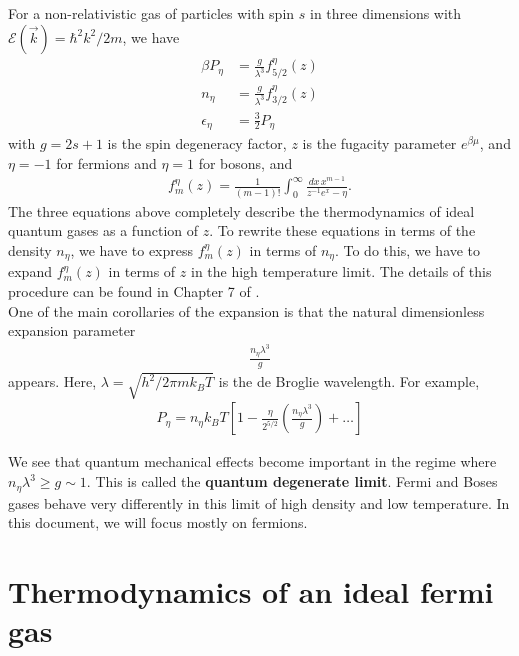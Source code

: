 \documentclass{book}
\theoremstyle{definition}
\newcommand{\be}{\beta}
\newcommand{\f}[2]{\frac{#1}{#2}}
\newcommand{\lp}{\left(}
\newcommand{\rp}{\right)}
\newcommand{\lb}{\left[}
\newcommand{\rb}{\right]}
\begin{document}
For a non-relativistic gas of particles with spin $s$ in three dimensions with $\mathcal{E}(\vec{k}) = \hbar^2k^2/2m$, we have 
\begin{align*}
	\be P_\eta &= \f{g}{\lambda^3} f^\eta_{5/2}(z) \\
	n_\eta &= \f{g}{\lambda^3} f_{3/2}^\eta(z)\\
	\epsilon_\eta &= \f{3}{2}P_\eta
\end{align*}
with $g = 2s+1$ is the spin degeneracy factor, $z$ is the fugacity parameter $e^{\be \mu}$, and $\eta = -1$ for fermions and $\eta = 1$ for bosons, and 
\begin{align*}
	f_m^\eta(z) = \f{1}{(m-1)!} \int_0^\infty \f{dx\, x^{m-1}}{ z^{-1} e^x - \eta }. 
\end{align*}
The three equations above completely describe the thermodynamics of ideal quantum gases as a function of $z$. To rewrite these equations in terms of the density $n_\eta$, we have to express $f^\eta_m(z)$ in terms of $n_\eta$. To do this, we have to expand $f^\eta_m(z)$ in terms of $z$ in the high temperature limit. The details of this procedure can be found in Chapter 7 of \cite{kardar2007statistical}.  \\

One of the main corollaries of the expansion is that the natural dimensionless expansion parameter 
\begin{align*}
	\f{n_\eta \lambda^3}{g} 
\end{align*}
appears. Here, $\lambda = \sqrt{h^2/2\pi mk_BT}$ is the de Broglie wavelength. For example,
\begin{align*}
	P_\eta = n_\eta k_B T \lb 1 - \f{\eta}{2^{5/2}}\lp \f{n_\eta \lambda^3}{g} \rp + \dots \rb
\end{align*}

We see that quantum mechanical effects become important in the regime where $n_\eta \lambda^3 \geq g \sim 1$. This is called the \textbf{quantum degenerate limit}. Fermi and Boses gases behave very differently in this limit of high density and low temperature. In this document, we will focus mostly on fermions. 


\section{Thermodynamics of an ideal fermi gas}
\end{document}
